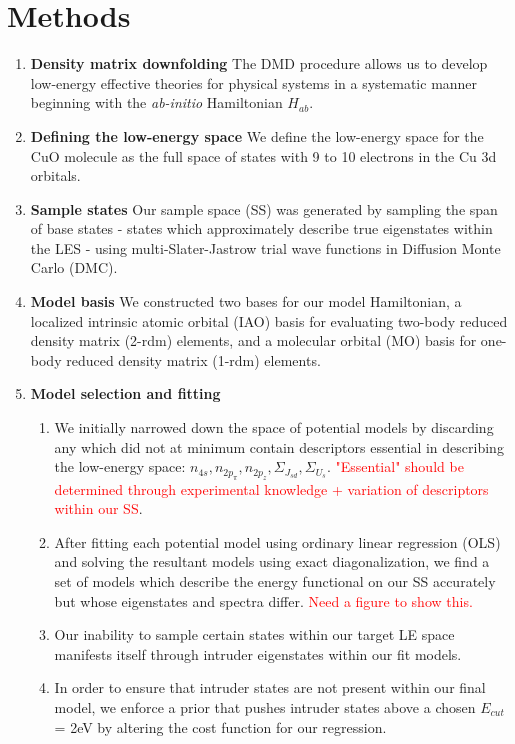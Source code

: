 \documentclass{article}
\begin{document}
\section{Methods}
\begin{enumerate}
\item \textbf{Density matrix downfolding} The DMD procedure allows us to develop low-energy effective theories for physical systems in a systematic manner beginning with the \textit{ab-initio} Hamiltonian $H_{ab}$.

\item \textbf{Defining the low-energy space} We define the low-energy space for the CuO molecule as the full space of states with 9 to 10 electrons in the Cu 3d orbitals.

\item \textbf{Sample states} Our sample space (SS) was generated by sampling the span of base states - states which approximately describe true eigenstates within the LES - using multi-Slater-Jastrow trial wave functions in Diffusion Monte Carlo (DMC).

\item \textbf{Model basis} We constructed two bases for our model Hamiltonian, a localized intrinsic atomic orbital (IAO) basis for evaluating two-body reduced density matrix (2-rdm) elements, and a molecular orbital (MO) basis for one-body reduced density matrix (1-rdm) elements.

\item \textbf{Model selection and fitting}
\begin{enumerate}
\item We initially narrowed down the space of potential models by discarding any which did not at minimum contain descriptors essential in describing the low-energy space: $n_{4s}, n_{2p_\pi}, n_{2p_z}, \Sigma_{J_{sd}}, \Sigma_{U_s}$. \textcolor{red}{"Essential" should be determined through experimental knowledge + variation of descriptors within our SS}.

\item After fitting each potential model using ordinary linear regression (OLS) and solving the resultant models using exact diagonalization, we find a set of models which describe the energy functional on our SS accurately but whose eigenstates and spectra differ. \textcolor{red}{Need a figure to show this.}

\item Our inability to sample certain states within our target LE space manifests itself through intruder eigenstates within our fit models.

\item In order to ensure that intruder states are not present within our final model, we enforce a prior that pushes intruder states above a chosen $E_{cut}$ = 2eV by altering the cost function for our regression. 
\end{enumerate}
\end{enumerate}
\end{document}

